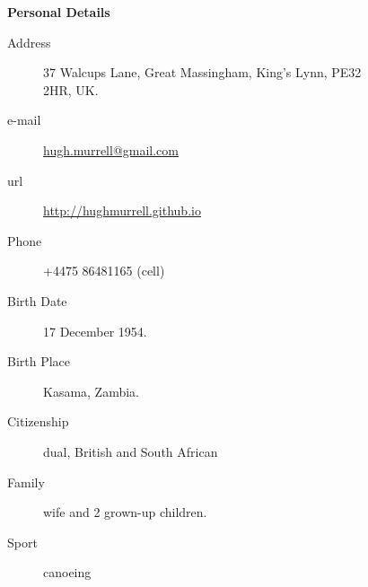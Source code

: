 \begin{description}\item[] \begin{description}\item[] {\large \bf   Personal Details  }
\begin{description}
\item[Address]  37 Walcups Lane, Great Massingham, King's Lynn, PE32 2HR, UK.
\item[e-mail]  \url{hugh.murrell@gmail.com}
\item[url]  \url{http://hughmurrell.github.io}
\item[Phone]  +4475 86481165 (cell)
\item[Birth Date]  17 December 1954.
\item[Birth Place]  Kasama, Zambia.
\item[Citizenship]  dual, British and South African
\item[Family]  wife and 2 grown-up children.
\item[Sport]  canoeing 
\end{description}
\end{description}
\end{description}
\label{f0}

